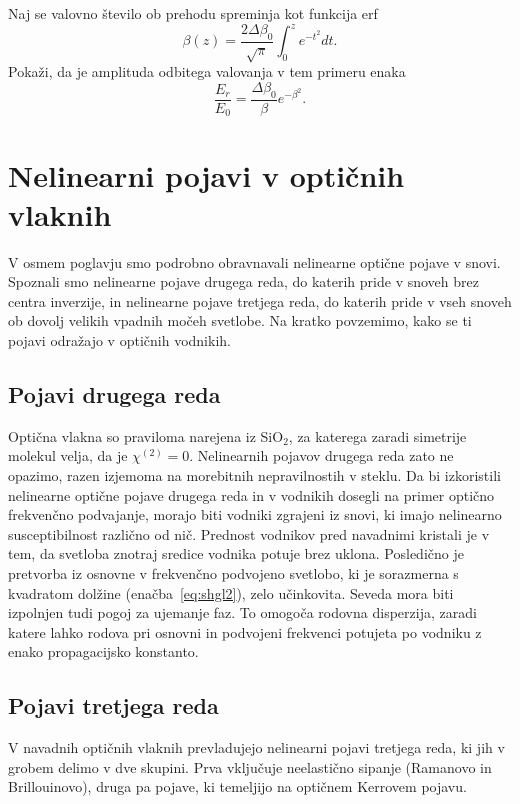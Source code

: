 \begin{definition}
Naj se valovno število ob prehodu spreminja kot funkcija erf
\begin{equation}
\beta (z)= \frac{2\Delta \beta_0}{\sqrt{\pi}} \int_0^z e^{-t^2}dt.
\end{equation}
Pokaži, da je amplituda odbitega valovanja v tem primeru enaka
\begin{equation}
\frac{E_r}{E_0} = \frac{\Delta \beta_0}{\beta}e^{-\beta^2}.
\end{equation}
\end{definition}

\section{Nelinearni pojavi v optičnih vlaknih}
V osmem poglavju smo podrobno obravnavali nelinearne optične pojave v snovi.
Spoznali smo nelinearne pojave drugega reda, do katerih pride v snoveh brez centra inverzije, 
in nelinearne pojave tretjega reda, do katerih pride v vseh snoveh ob dovolj velikih vpadnih
močeh svetlobe. Na kratko povzemimo, kako se ti pojavi odražajo v optičnih vodnikih. 

\subsection*{Pojavi drugega reda}
Optična vlakna so praviloma narejena iz SiO$_2$, 
za katerega zaradi simetrije molekul velja, da je $\chi^{(2)}=0$. 
Nelinearnih pojavov drugega reda zato ne opazimo, razen izjemoma na morebitnih 
nepravilnostih v steklu.
Da bi izkoristili nelinearne optične pojave
drugega reda in v vodnikih dosegli na primer optično frekvenčno podvajanje,
morajo biti vodniki zgrajeni iz snovi, ki imajo nelinearno susceptibilnost 
različno od nič. Prednost vodnikov pred navadnimi kristali je v tem, 
da svetloba znotraj sredice vodnika potuje brez uklona. Posledično je
pretvorba iz osnovne v frekvenčno podvojeno svetlobo, ki je sorazmerna s kvadratom 
dolžine (enačba~\ref{eq:shgl2}), zelo učinkovita. Seveda 
mora biti izpolnjen tudi pogoj za ujemanje faz. To 
omogoča rodovna disperzija, zaradi 
katere lahko rodova pri osnovni in podvojeni frekvenci potujeta po vodniku
z enako propagacijsko konstanto.

\subsection*{Pojavi tretjega reda}
V navadnih optičnih vlaknih  
prevladujejo nelinearni pojavi tretjega reda, ki jih v grobem delimo v dve skupini. Prva vključuje
neelastično sipanje (Ramanovo in Brillouinovo), druga pa pojave, ki 
temeljijo na optičnem Kerrovem pojavu.

